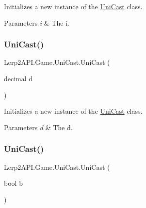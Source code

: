 Initializes a new instance of the \hyperlink{class_lerp2_a_p_i_1_1_game_1_1_uni_cast}{Uni\+Cast} class. 


\begin{DoxyParams}{Parameters}
{\em i} & The i.\\
\hline
\end{DoxyParams}
\mbox{\label{class_lerp2_a_p_i_1_1_game_1_1_uni_cast_ae6f6b405e50262d6d9c4ca03a255c219}} 
\subsubsection{\texorpdfstring{Uni\+Cast()}{UniCast()}\hspace{0.1cm}{\footnotesize\ttfamily [3/4]}}
{\footnotesize\ttfamily Lerp2\+A\+P\+I.\+Game.\+Uni\+Cast.\+Uni\+Cast (\begin{DoxyParamCaption}\item[{decimal}]{d }\end{DoxyParamCaption})\hspace{0.3cm}{\ttfamily [inline]}}



Initializes a new instance of the \hyperlink{class_lerp2_a_p_i_1_1_game_1_1_uni_cast}{Uni\+Cast} class. 


\begin{DoxyParams}{Parameters}
{\em d} & The d.\\
\hline
\end{DoxyParams}
\mbox{\label{class_lerp2_a_p_i_1_1_game_1_1_uni_cast_a12ebf426db671515de776a0a42ff98ae}} 
\subsubsection{\texorpdfstring{Uni\+Cast()}{UniCast()}\hspace{0.1cm}{\footnotesize\ttfamily [4/4]}}
{\footnotesize\ttfamily Lerp2\+A\+P\+I.\+Game.\+Uni\+Cast.\+Uni\+Cast (\begin{DoxyParamCaption}\item[{bool}]{b }\end{DoxyParamCaption})\hspace{0.3cm}{\ttfamily [inline]}}



